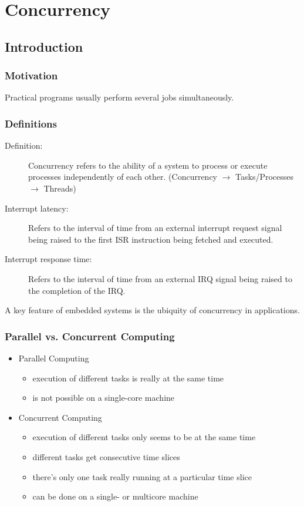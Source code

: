 \section{Concurrency}
\subsection{Introduction}
\subsubsection{Motivation}
Practical programs usually perform several jobs \glqq simultaneously\grqq.

\subsubsection{Definitions}
\begin{description}
  \item[Definition:] Concurrency refers to the ability of a system to process or execute processes independently of each other.
        (Concurrency $\rightarrow$ Tasks/Processes $\rightarrow$ Threads)
  \item [Interrupt latency:] Refers to the interval of time from an external interrupt request signal being raised to the first ISR instruction being fetched and executed.
  \item [Interrupt response time:] Refers to the interval of time from an external IRQ signal being raised to the completion of the IRQ.
\end{description}
A key feature of embedded systems is the ubiquity of concurrency in applications.

\subsubsection{Parallel vs. Concurrent Computing}
\begin{itemize}
  \item Parallel Computing
        \begin{itemize}
          \item execution of different tasks is really at the same time
          \item is not possible on a single-core machine
        \end{itemize}
  \item Concurrent Computing
        \begin{itemize}
          \item execution of different tasks only seems to be at the same time
          \item different tasks get consecutive time slices
          \item there's only one task really running at a particular time slice
          \item can be done on a single- or multicore machine
        \end{itemize}
\end{itemize}


